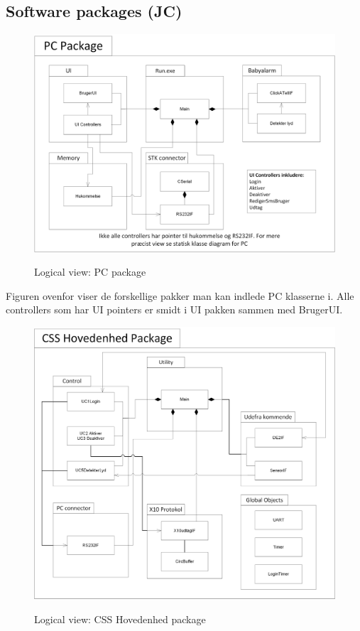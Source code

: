 \clearpage

\subsection{Software packages (JC)}

\begin{figure}[!htb]
     {\includegraphics[width=\textwidth]{billeder/uml/logical_view_pc}}
     \caption{Logical view: PC package}
\end{figure}

Figuren ovenfor viser de forskellige pakker man kan indlede PC klasserne i. Alle controllers som har UI pointers er smidt i UI pakken sammen med BrugerUI. 


\clearpage

\begin{figure}[!htb]
     {\includegraphics[width=\textwidth]{billeder/uml/logical_view_CSS_Hovedenhed}}
     \caption{Logical view: CSS Hovedenhed package}
     \label{fig:CSS_Hovedenhed_package}
\end{figure}

